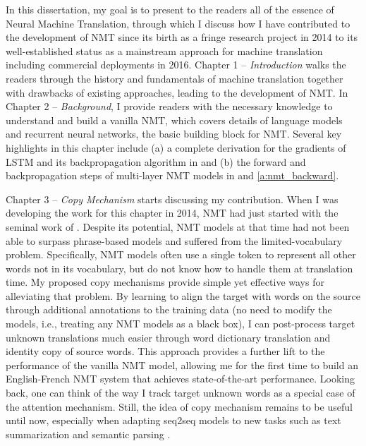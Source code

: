 In this dissertation, my goal is to present to the readers all of the essence of
Neural Machine Translation, through which I discuss how I have contributed to
the development of NMT since its birth as a fringe research project in 2014 to
its well-established status as a mainstream approach for machine translation
including commercial deployments in 2016. Chapter 1 -- {\it Introduction} walks
the readers through the history and fundamentals of machine translation together
with drawbacks of existing approaches, leading to the development of NMT. In
Chapter 2 -- {\it Background}, I provide readers with the necessary
knowledge to understand and build a vanilla NMT, which covers details of
language models and recurrent neural networks, the basic building block for NMT.
Several key highlights in this chapter include (a) a complete derivation for the
gradients of LSTM and its backpropagation algorithm in  and
(b) the forward and backpropagation steps of multi-layer NMT models in
 and \ref{a:nmt_backward}.

Chapter 3 -- {\it Copy Mechanism} starts discussing my contribution. When I was
developing the work for this chapter in 2014, NMT had just started with the
seminal work of . Despite its potential, NMT models at that
time had not been able to surpass phrase-based models and suffered from the
limited-vocabulary problem. Specifically, NMT models often use a single \unk{}
token to represent all other words not in its vocabulary, but do not know how to
handle them at translation time. My proposed copy mechanisms provide simple yet
effective ways for alleviating that problem. By learning to align the target
\unk{} with words on the source through additional annotations to the training
data (no need to modify the models, i.e., treating any NMT models as a black
box), I can post-process target unknown translations much easier through word
dictionary translation and identity copy of source words. This approach provides
a further lift to the performance of the vanilla NMT model, allowing me for the
first time to build an English-French NMT system that achieves state-of-the-art
performance. Looking back, one can think of the way I track target unknown words
as a special case of the attention mechanism. Still, the idea of copy mechanism
remains to be useful until now, especially when adapting seq2seq models to new
tasks such as text summarization \cite{gu16,gulcehre16} and semantic parsing
\cite{jia16}.


